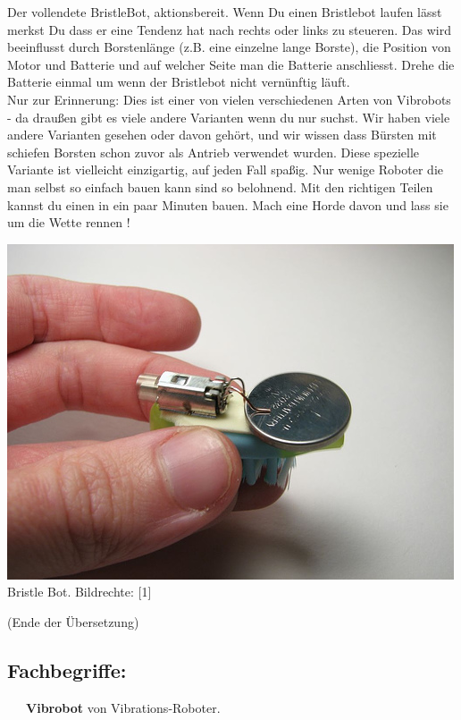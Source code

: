 Der vollendete BristleBot, aktionsbereit. Wenn Du einen Bristlebot laufen lässt merkst Du dass er eine Tendenz hat nach rechts oder links zu steueren. Das wird beeinflusst durch Borstenlänge (z.B. eine einzelne lange Borste), die Position von Motor und Batterie und auf welcher Seite man die Batterie anschliesst. Drehe die Batterie einmal um wenn der Bristlebot nicht vernünftig läuft.
\\  

Nur zur Erinnerung: Dies ist einer von vielen verschiedenen Arten von Vibrobots - da draußen gibt es viele andere Varianten wenn du nur suchst. Wir haben viele andere Varianten gesehen oder davon gehört, und wir wissen dass Bürsten mit schiefen Borsten schon zuvor als Antrieb verwendet wurden. Diese spezielle Variante ist vielleicht einzigartig, auf jeden Fall spaßig. Nur wenige Roboter die man selbst so einfach bauen kann sind so belohnend. Mit den richtigen Teilen kannst du einen in ein paar Minuten bauen. Mach eine Horde davon und lass sie um die Wette rennen !
\
\begin{center}
\includegraphics[width=\linewidth]{bristlebot/bristlebot14.jpg}
\footnotesize{Bristle Bot. Bildrechte: [1]}
\end{center}

(Ende der Übersetzung) \\

\subsection*{Fachbegriffe:}

~~~\textbf{Vibrobot} von Vibrations-Roboter. \\

